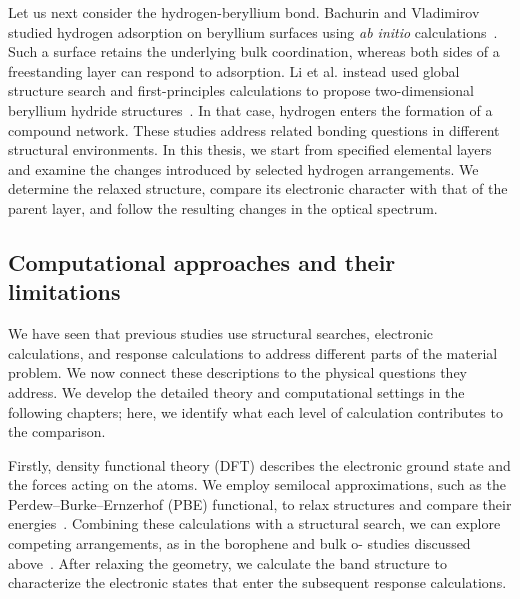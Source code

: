 Let us next consider the hydrogen-beryllium bond.
Bachurin and Vladimirov studied hydrogen adsorption on beryllium surfaces using \textit{ab initio} calculations~\cite{bachurin2015ab}.
Such a surface retains the underlying bulk coordination, whereas both sides of a freestanding layer can respond to adsorption.
Li et al. instead used global structure search and first-principles calculations to propose two-dimensional beryllium hydride structures~\cite{li2018global}.
In that case, hydrogen enters the formation of a compound network.
These studies address related bonding questions in different structural environments.
In this thesis, we start from specified elemental layers and examine the changes introduced by selected hydrogen arrangements.
We determine the relaxed structure, compare its electronic character with that of the parent layer, and follow the resulting changes in the optical spectrum.

\subsection{Computational approaches and their limitations}
\label{subsec:lit_methods}

We have seen that previous studies use structural searches, electronic calculations, and response calculations to address different parts of the material problem.
We now connect these descriptions to the physical questions they address.
We develop the detailed theory and computational settings in the following chapters; here, we identify what each level of calculation contributes to the comparison.

Firstly, density functional theory (DFT) describes the electronic ground state and the forces acting on the atoms.
We employ semilocal approximations, such as the Perdew--Burke--Ernzerhof (PBE) functional, to relax structures and compare their energies~\cite{perdew1996generalized}.
Combining these calculations with a structural search, we can explore competing arrangements, as in the borophene and bulk o- studies discussed above~\cite{penev2012polymorphism,han2023superconducting}.
After relaxing the geometry, we calculate the band structure to characterize the electronic states that enter the subsequent response calculations.

